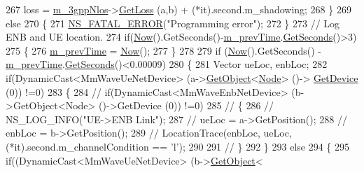 \begin{DoxyCode}
267                 loss =  \hyperlink{classns3_1_1MmWave3gppBuildingsPropagationLossModel_a18ac2d667b12fa593c0ea044ad05af82}{m\_3gppNlos}->\hyperlink{classMmWave3gppPropagationLossModel_ae389c108155d92774975e8a8d0de9c6a}{GetLoss} (a,b) + (*it).second.m\_shadowing;
268         \}
269         \textcolor{keywordflow}{else}
270         \{
271                 \hyperlink{group__fatal_ga5131d5e3f75d7d4cbfd706ac456fdc85}{NS\_FATAL\_ERROR}(\textcolor{stringliteral}{"Programming error"});
272         \}
273         \textcolor{comment}{// Log ENB and UE location.}
274         \textcolor{keywordflow}{if}(\hyperlink{group__simulator_gac3635e2e87f7ce316c89290ee1b01d0d}{Now}().GetSeconds()-\hyperlink{classns3_1_1MmWave3gppBuildingsPropagationLossModel_a08f254d1073c8254d595810f8580a7e7}{m\_prevTime}.\hyperlink{classns3_1_1Time_a8f20d5c3b0902d7b4320982f340b57c8}{GetSeconds}()>3)
275         \{
276                 \hyperlink{classns3_1_1MmWave3gppBuildingsPropagationLossModel_a08f254d1073c8254d595810f8580a7e7}{m\_prevTime} = \hyperlink{group__simulator_gac3635e2e87f7ce316c89290ee1b01d0d}{Now}();
277         \}
278 
279         \textcolor{keywordflow}{if} (\hyperlink{group__simulator_gac3635e2e87f7ce316c89290ee1b01d0d}{Now}().GetSeconds() - \hyperlink{classns3_1_1MmWave3gppBuildingsPropagationLossModel_a08f254d1073c8254d595810f8580a7e7}{m\_prevTime}.\hyperlink{classns3_1_1Time_a8f20d5c3b0902d7b4320982f340b57c8}{GetSeconds}()<0.00009)
280         \{
281                 Vector ueLoc, enbLoc;
282                 \textcolor{keywordflow}{if}(DynamicCast<MmWaveUeNetDevice> (a->\hyperlink{classns3_1_1Object_a13e18c00017096c8381eb651d5bd0783}{GetObject}<\hyperlink{classns3_1_1Node}{Node}> ()->
      \hyperlink{classns3_1_1Node_a5918dfd24ef632efc9a83a5f6561c76e}{GetDevice} (0)) !=0)
283                 \{
284                         \textcolor{comment}{// if(DynamicCast<MmWaveEnbNetDevice> (b->GetObject<Node> ()->GetDevice (0)) !=0)}
285                         \textcolor{comment}{// \{}
286                         \textcolor{comment}{//      NS\_LOG\_INFO("UE->ENB Link");}
287                         \textcolor{comment}{//      ueLoc = a->GetPosition();}
288                         \textcolor{comment}{//      enbLoc = b->GetPosition();}
289                         \textcolor{comment}{//      LocationTrace(enbLoc, ueLoc, (*it).second.m\_channelCondition == 'l');}
290 
291                         \textcolor{comment}{// \}}
292                 \}
293                 \textcolor{keywordflow}{else}
294                 \{
295                         \textcolor{keywordflow}{if}((DynamicCast<MmWaveUeNetDevice> (b->\hyperlink{classns3_1_1Object_a13e18c00017096c8381eb651d5bd0783}{GetObject}<

\end{DoxyCode}
